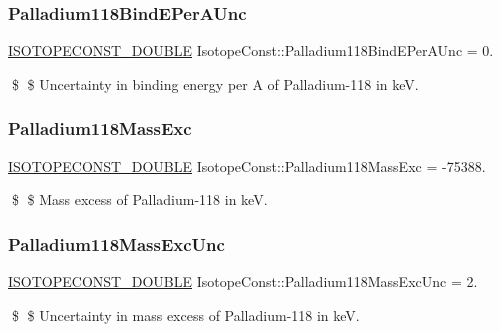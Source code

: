 \subsubsection{\texorpdfstring{Palladium118\+Bind\+E\+Per\+A\+Unc}{Palladium118BindEPerAUnc}}
{\footnotesize\ttfamily \mbox{\hyperlink{group___isotope_const-_macros_ga8f45a7272ce02c0b4c65c44636ed719a}{I\+S\+O\+T\+O\+P\+E\+C\+O\+N\+S\+T\+\_\+\+D\+O\+U\+B\+LE}} Isotope\+Const\+::\+Palladium118\+Bind\+E\+Per\+A\+Unc = 0.}

\$ \$ Uncertainty in binding energy per A of Palladium-\/118 in keV. \mbox{\label{group___isotope_const-_palladium-_pd118_gabb10d481f99a59fb1130ced55c76573c}} 
\subsubsection{\texorpdfstring{Palladium118\+Mass\+Exc}{Palladium118MassExc}}
{\footnotesize\ttfamily \mbox{\hyperlink{group___isotope_const-_macros_ga8f45a7272ce02c0b4c65c44636ed719a}{I\+S\+O\+T\+O\+P\+E\+C\+O\+N\+S\+T\+\_\+\+D\+O\+U\+B\+LE}} Isotope\+Const\+::\+Palladium118\+Mass\+Exc = -\/75388.}

\$ \$ Mass excess of Palladium-\/118 in keV. \mbox{\label{group___isotope_const-_palladium-_pd118_ga39d49f372455edc92f4ebb67ff585486}} 
\subsubsection{\texorpdfstring{Palladium118\+Mass\+Exc\+Unc}{Palladium118MassExcUnc}}
{\footnotesize\ttfamily \mbox{\hyperlink{group___isotope_const-_macros_ga8f45a7272ce02c0b4c65c44636ed719a}{I\+S\+O\+T\+O\+P\+E\+C\+O\+N\+S\+T\+\_\+\+D\+O\+U\+B\+LE}} Isotope\+Const\+::\+Palladium118\+Mass\+Exc\+Unc = 2.}

\$ \$ Uncertainty in mass excess of Palladium-\/118 in keV. \mbox{\label{group___isotope_const-_palladium-_pd118_ga8ef84c6b5b2c976c7a310cade2a8bde7}} 
